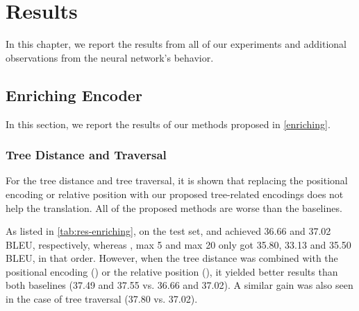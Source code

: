 \chapter{Results}
\label{result}

In this chapter, we report the results from all of our experiments and additional observations from the neural network's behavior.

\section{Enriching Encoder}
\label{result-enriching}

In this section, we report the results of our methods proposed in \cref{enriching}.

\subsection{Tree Distance and Traversal}

For the tree distance and tree traversal, it is shown that replacing the positional encoding or relative position with our proposed tree-related encodings does not help the translation.
All of the proposed methods are worse than the baselines.

As listed in \cref{tab:res-enriching}, on the test set, \transformerbase and \transformerrel achieved 36.66 and 37.02 BLEU, respectively, whereas \TreeTraversal, \TreeDistance max 5 and max 20 only got 35.80, 33.13 and 35.50 BLEU, in that order.
However, when the tree distance was combined with the positional encoding (\transformerbase) or the relative position (\transformerrel), it yielded better results than both baselines (37.49 and 37.55 vs. 36.66 and 37.02).
A similar gain was also seen in the case of tree traversal (37.80 vs. 37.02).

